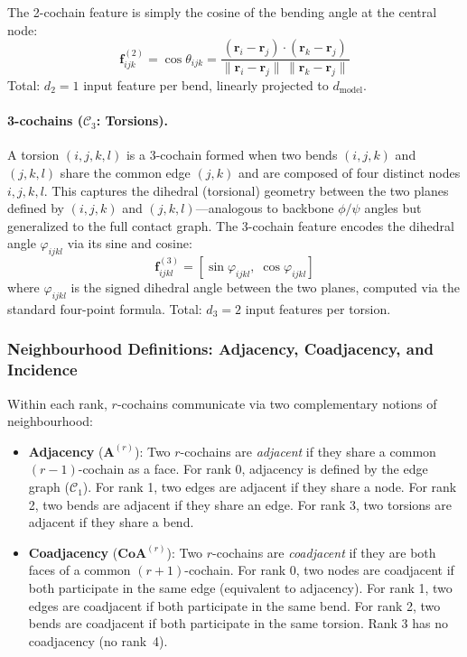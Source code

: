 \documentclass{article}
\begin{document}
The 2-cochain feature is simply the cosine of the bending angle at the central node:
\begin{equation}
    \mathbf{f}_{ijk}^{(2)} = \cos\theta_{ijk} = \frac{(\mathbf{r}_i - \mathbf{r}_j) \cdot (\mathbf{r}_k - \mathbf{r}_j)}{\|\mathbf{r}_i - \mathbf{r}_j\| \, \|\mathbf{r}_k - \mathbf{r}_j\|}
\end{equation}
Total: $d_2 = 1$ input feature per bend, linearly projected to $d_{\text{model}}$.

\paragraph{3-cochains ($\mathcal{C}_3$: Torsions).} A torsion $(i, j, k, l)$ is a 3-cochain formed when two bends $(i, j, k)$ and $(j, k, l)$ share the common edge $(j, k)$ and are composed of four distinct nodes $i, j, k, l$. This captures the dihedral (torsional) geometry between the two planes defined by $(i, j, k)$ and $(j, k, l)$---analogous to backbone $\phi/\psi$ angles but generalized to the full contact graph. The 3-cochain feature encodes the dihedral angle $\varphi_{ijkl}$ via its sine and cosine:
\begin{equation}
    \mathbf{f}_{ijkl}^{(3)} = [\sin\varphi_{ijkl}, \; \cos\varphi_{ijkl}]
\end{equation}
where $\varphi_{ijkl}$ is the signed dihedral angle between the two planes, computed via the standard four-point formula. Total: $d_3 = 2$ input features per torsion.

\subsubsection{Neighbourhood Definitions: Adjacency, Coadjacency, and Incidence}

Within each rank, $r$-cochains communicate via two complementary notions of neighbourhood:

\begin{itemize}
    \item \textbf{Adjacency} ($\mathbf{A}^{(r)}$): Two $r$-cochains are \emph{adjacent} if they share a common $(r{-}1)$-cochain as a face. For rank 0, adjacency is defined by the edge graph ($\mathcal{C}_1$). For rank 1, two edges are adjacent if they share a node. For rank 2, two bends are adjacent if they share an edge. For rank 3, two torsions are adjacent if they share a bend.
    \item \textbf{Coadjacency} ($\mathbf{CoA}^{(r)}$): Two $r$-cochains are \emph{coadjacent} if they are both faces of a common $(r{+}1)$-cochain. For rank 0, two nodes are coadjacent if both participate in the same edge (equivalent to adjacency). For rank 1, two edges are coadjacent if both participate in the same bend. For rank 2, two bends are coadjacent if both participate in the same torsion. Rank 3 has no coadjacency (no rank~4).
\end{itemize}
\end{document}
